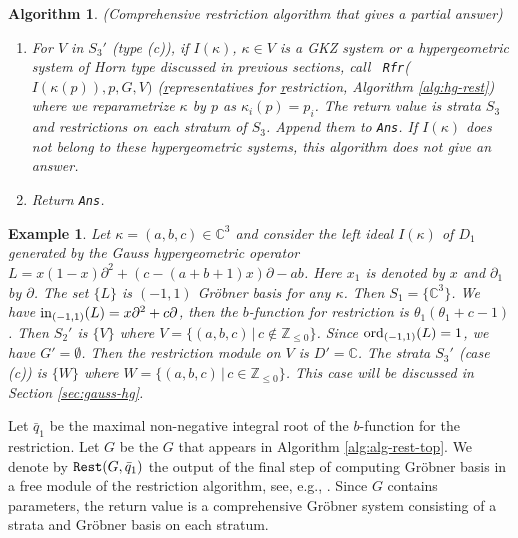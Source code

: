 \documentclass{article}
\def\CC{\mathbb{C}}
\def\ZZ{\mathbb{Z}}
\def\p{\partial}
\def\pd#1{\partial_{#1}}
\newtheorem{example}{Example}
\newtheorem{algorithm}{Algorithm}
\begin{document}
\begin{algorithm}{\rm (Comprehensive restriction algorithm that gives 
a partial answer)}
\begin{enumerate}
\begin{enumerate}
\item The restriction module on each stratum $W$ of $S_2$ of type (a) is
$\frac{D'}{\left\langle \mbox{\rm (a Gr\"obner basis of $G''$ on $W$)} \right\rangle}$
where $D'=\CC\langle x_{m+1}, \ldots, x_n, \pd{m+1}, \ldots, \pd{n} \rangle$.
Append them to {\tt Ans}.
\item The restriction module (output) is $0$ on the set of strata of $S_2'$ of type (b). Append them to {\tt Ans}.
\end{enumerate}
\item For $V$ in $S_3'$ (type (c)), 
if $I(\kappa)$, $\kappa \in V$ is a GKZ system or a hypergeometric system of Horn type discussed in previous sections, 
call 
\, {\tt Rfr}($I(\kappa(p)), p,G, V)$ (\underline{r}epresentatives \underline{f}or \underline{r}estriction, Algorithm \ref{alg:hg-rest})
where we reparametrize $\kappa$ by $p$ as $\kappa_i(p)=p_i$.
The return value is strata $S_3$ and restrictions on each stratum of $S_3$.
Append them to {\tt Ans}.
If $I(\kappa)$ does not belong to these hypergeometric systems, this algorithm
does not give an answer.
\item Return {\tt Ans}.
\end{enumerate}
\end{algorithm}

\begin{example}\rm
Let $\kappa=(a,b,c) \in \CC^3$
and consider the left ideal $I(\kappa)$ of $D_1$
generated by the Gauss hypergeometric operator
$ L=x(1-x)\p^2 + (c - (a + b + 1)x)\p - ab $.
Here $x_1$ is denoted by $x$ and $\pd{1}$ by $\p$.
The set $\{L\}$ is $(-1,1)$ Gr\"obner basis for any $\kappa$.
Then $S_1 = \{ \CC^3 \}$.
We have ${\rm in}_{(-1,1)} (L)= x \p^2 + c \p$,
then the $b$-function for restriction is $\theta_1 (\theta_1+c-1)$.
Then $S_2'$ is $\{ V \}$ where
$V=\{ (a,b,c) \,|\, c \not\in \ZZ_{\leq 0} \}$.
Since ${\rm ord}_{(-1,1)}(L)=1$, we have $G'=\emptyset$.
Then the restriction module on $V$ is $D'=\CC$.
The strata $S_3'$ (case (c)) is $\{W\}$ where 
$W=\{ (a,b,c) \,|\, c \in \ZZ_{\leq 0} \}$.
This case will be discussed in Section \ref{sec:gauss-hg}.
\end{example}

Let ${\bar q}_1$ be the maximal non-negative integral root
of the $b$-function for the restriction.
Let $G$ be the $G$ that appears in Algorithm \ref{alg:alg-rest-top}.
We denote by 
$\mbox{\tt Rest}(G,{\bar q}_1)$
the output of the final step of 
computing Gr\"obner basis in a free module
of the restriction algorithm, see, e.g.,
\cite[Steps 6 and 7 of Alg. 5.2.8]{SST}.
Since $G$ contains parameters, the return value is 
a comprehensive Gr\"obner system consisting of a strata and
Gr\"obner basis on each stratum.
\end{document}
